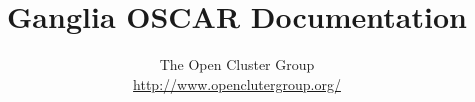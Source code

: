 \documentclass[letterpaper,11pt]{article}
\newcommand{\href}[2]{\underline{#2}}
\newcommand{\url}[1]{\href{#1}{#1}}
\begin{document}
\title{Ganglia OSCAR Documentation}

\author{The Open Cluster Group \\
\url{http://www.openclutergroup.org/}}
\maketitle



\end{document}
